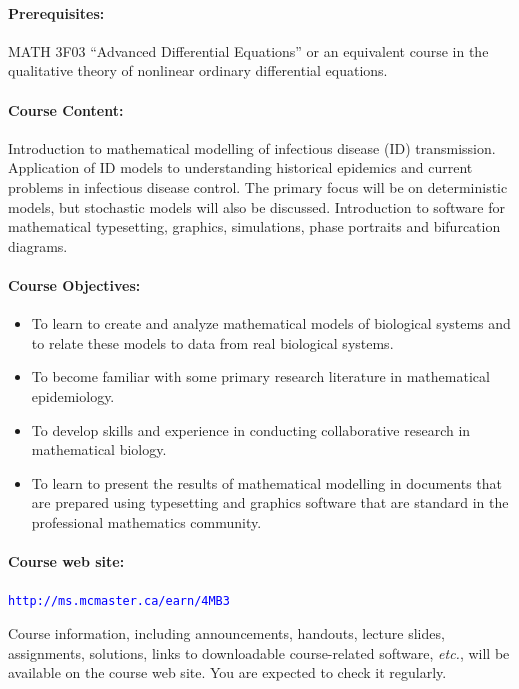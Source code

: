 \documentclass[12pt]{article}
\newcommand{\url}[1]{{\tt\textcolor{blue}{#1}}}
\begin{document}
\paragraph*{Prerequisites:} MATH 3F03 ``Advanced Differential Equations'' or an equivalent course in the qualitative theory of nonlinear ordinary differential equations.

\paragraph*{Course Content:}
Introduction to mathematical modelling of infectious disease (ID) transmission.  Application of ID models to understanding historical epidemics and current problems in infectious disease control.  The primary focus will be on deterministic models, but stochastic models will also be discussed.   Introduction to software for mathematical typesetting, graphics, simulations, phase portraits and bifurcation diagrams.

\paragraph*{Course Objectives:}

\begin{itemize}
\item To learn to create and analyze mathematical models of biological systems and to relate these models to data from real biological systems.  
\item To become familiar with some primary research literature in mathematical epidemiology.
\item To develop skills and experience in conducting collaborative research in mathematical biology.
\item To learn to present the results of mathematical modelling in documents that are prepared using typesetting and graphics software that are standard in the professional mathematics community.
\end{itemize}

\paragraph*{Course web site:} \url{http://ms.mcmaster.ca/earn/4MB3}

\noindent
Course information, including announcements, handouts, lecture slides, assignments, solutions, links to downloadable course-related software, {\it etc.\/}, will be available on the course web site.  You are expected to check it regularly.
\end{document}
